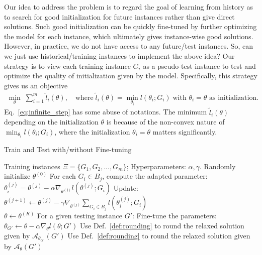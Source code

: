 Our idea to address the problem is to regard the goal of learning from history as to search for good initialization for future instances rather than give direct solutions. Such good initialization can be quickly fine-tuned by further optimizing the model for each instance, which ultimately gives instance-wise good solutions. However, in practice, we do not have access to any future/test instances. So, can we just use historical/training instances to implement the above idea? Our strategy is to view each training instance $G_i$ as a pseudo-test instance to test and optimize the quality of initialization given by the model. Specifically, this strategy gives us an objective
\begin{equation}
\label{eq:infinite_step}
\begin{aligned}
\min_{\theta} \;\sum_{i=1}^m \tilde{l}_i(\theta), \quad \text{where}\; \tilde{l}_i(\theta) = \min_{\theta_i} l(\theta_i;G_i) \;\text{with $\theta_i=\theta$ as initialization.}
\end{aligned}
\end{equation}
Eq.~\ref{eq:infinite_step} has some abuse of notations. The minimum $\tilde{l}_i(\theta)$  depending on the initialization $\theta$ is because of the non-convex nature of  $\min_{\theta_i} l(\theta_i;G_i)$, where the initialization $\theta_i=\theta$ matters significantly. 

\begin{algorithm}[t]
\caption{Train \proj and Test \proj with/without Fine-tuning}
\label{method:alg_table}
\begin{algorithmic}[1]
\Require Training instances $\Xi=\{G_1,G_2,...,G_m\}$; Hyperparameters: $\alpha, \gamma$.
\State Randomly initialize $\theta^{(0)}$
 
\State For each $G_i\in B_j$, compute the adapted parameter: $\theta_i^{(j)} = \theta^{(j)} - \alpha \nabla_{\theta^{(j)}}l(\theta^{(j)};G_i)$
\State Update: $\theta^{(j+1)} \gets \theta^{(j)} - \gamma \nabla_{\theta^{(j)}} \sum_{G_i \in B_j} l(\theta_i^{(j)};G_i)$
\EndFor \\
\Return $\theta\leftarrow \theta^{(K)}$
\State For a given testing instance $G'$: 
\State Fine-tune the parameters: $\theta_{G'} \gets \theta - \alpha \nabla_{\theta} l(\theta; G')$ 
\State Use Def.~\ref{def:rounding} to round the relaxed solution given by $\mathcal{A}_{\theta_{G'}} (G')$ 
\Else
\State Use Def.~\ref{def:rounding} to round the relaxed solution given by $\mathcal{A}_{\theta} (G')$ 
\EndIf {}
\end{algorithmic}
\end{algorithm}

